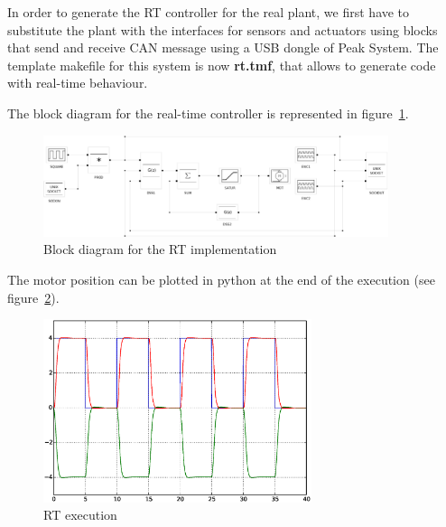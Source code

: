 In order to generate the RT controller for the real plant, we first have to 
substitute the plant with the interfaces for sensors and actuators using blocks 
that send and receive CAN message using a USB dongle of Peak System. The 
template makefile for this system is now \textbf{rt.tmf}, that allows to 
generate code with real-time behaviour.

The block diagram for the real-time controller is represented in 
figure~\ref{F23}.

\begin{figure}[htbp]	%
\centering
\includegraphics[width=0.9\textwidth]{eps/disksrt.eps}
\caption{Block diagram for the RT implementation}
\label{F23}
\end{figure}

The motor position can be plotted in python at the end of the execution (see 
figure~\ref{F24}).

\begin{figure}[htbp]	%
\centering
\includegraphics[width=0.7\textwidth]{eps/rtout.eps}
\caption{RT execution}
\label{F24}
\end{figure}
